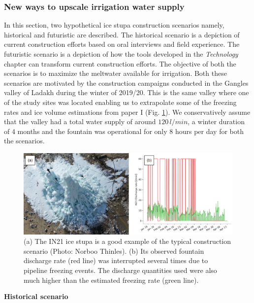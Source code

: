 \subsubsection{New ways to upscale irrigation water supply}

In this section, two hypothetical ice stupa construction scenarios namely, historical and
futuristic are described. The historical scenario is a depiction of current construction efforts based on oral interviews and
field experience. The futuristic scenario is a depiction of how the tools developed in the \textit{Technology}
chapter can transform current construction efforts. The objective of both the scenarios is to maximize the
meltwater available for irrigation. Both these scenarios are motivated by the construction campaigns conducted
in the Gangles valley of Ladakh during the winter of 2019/20. This is the same valley where one of the study
sites was located enabling us to extrapolate some of the freezing rates and ice volume estimations from paper I
(Fig. \ref{fig:gangles_data}). We conservatively assume that the valley had a total water supply of around
$120\,l/min$, a winter duration of 4 months and the fountain was operational for only 8 hours per day for both
the scenarios. 

\begin{figure}[htb]
	\includegraphics[width=\textwidth]{figs/gangles_data}

  \caption{(a) The IN21 ice stupa is a good example of the typical construction scenario (Photo: Norboo
  Thinles). (b) Its observed fountain discharge rate (red line) was interrupted several times due to pipeline
freezing events. The discharge quantities used were also much higher than the estimated freezing rate (green
line). }

	\label{fig:gangles_data}
\end{figure}

\textbf{Historical scenario}


